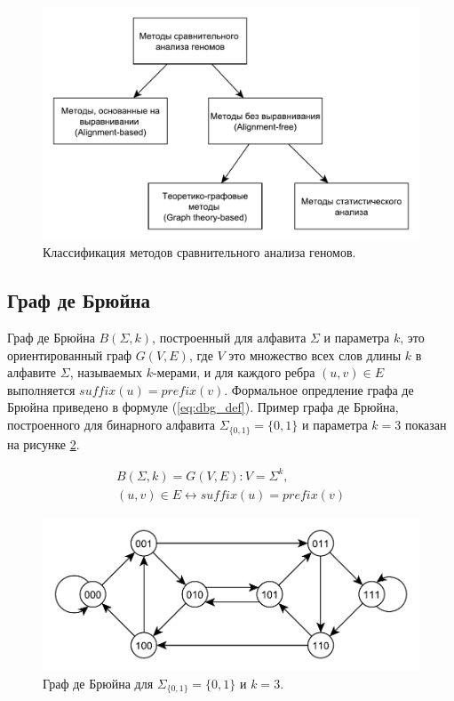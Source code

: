 \begin{figure}[htbp]
	\includegraphics[width=\textwidth]{img/classif.pdf}
	\caption{Классификация методов сравнительного анализа геномов.}
	\label{fig:classif}
\end{figure}

\subsection{Граф де Брюйна}

Граф де Брюйна $ B\left(\Sigma,k\right) $, построенный для алфавита $ \Sigma  $ и параметра $ k $, это ориентированный граф $ G\left(V,E\right) $, где $ V $ это множество всех слов длины $ k $ в алфавите $ \Sigma $, называемых $k$-мерами, и для каждого ребра $ \left(u,v\right)\in E $ выполняется $ suffix\left(u\right)=prefix\left(v\right) $. Формальное опредление графа де Брюйна приведено в формуле (\ref{eq:dbg_def}). Пример графа де Брюйна, построенного для бинарного алфавита $ \Sigma_{\{0,1\}}=\{0,1\} $ и параметра $ k=3 $ показан на рисунке \ref{fig:dbg_ex}.

\begin{equation}
	\begin{split}
		B\left(\Sigma,k\right)=G\left(V,E\right): V=\Sigma^k, \\
		\left(u,v\right)\in E\leftrightarrow suffix\left(u\right)=prefix\left(v\right)
	\end{split}
	\label{eq:dbg_def}
\end{equation}


\begin{figure}[htbp]
	\centering
	\includegraphics[width=\textwidth]{img/dbg_ex.pdf}
	\caption{Граф де Брюйна для $ \Sigma_{\{0,1\}}=\{0,1\} $ и $ k=3 $.}
	\label{fig:dbg_ex}
\end{figure}

